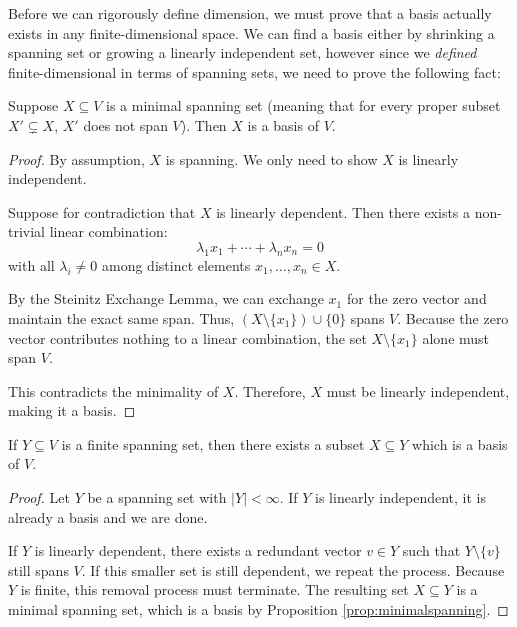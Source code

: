 \documentclass[../linear_algebra_and_groups.tex]{subfiles}
\begin{document}
Before we can rigorously define dimension, we must prove that a basis actually exists in any finite-dimensional space. We can find a basis either by shrinking a spanning set or growing a linearly independent set, however since we \textit{defined} finite-dimensional in terms of spanning sets, we need to prove the following fact:

\begin{proposition}
\label{prop:minimalspanning}
    \begin{shaded*}
        Suppose $X \subseteq V$ is a minimal spanning set (meaning that for every proper subset $X' \subsetneq X$, $X'$ does not span $V$). Then $X$ is a basis of $V$.
    \end{shaded*}
\end{proposition}
\begin{proof}
    By assumption, $X$ is spanning. We only need to show $X$ is linearly independent. 
    
    Suppose for contradiction that $X$ is linearly dependent. Then there exists a non-trivial linear combination:
    \[ \lambda_1 x_1 + \cdots + \lambda_n x_n = 0 \]
    with all $\lambda_i \ne 0$ among distinct elements $x_1, \dots, x_n \in X$. 
    
    By the Steinitz Exchange Lemma, we can exchange $x_1$ for the zero vector and maintain the exact same span. Thus, $(X \setminus \{x_1\}) \cup \{0\}$ spans $V$. Because the zero vector contributes nothing to a linear combination, the set $X \setminus \{x_1\}$ alone must span $V$. 
    
    This contradicts the minimality of $X$. Therefore, $X$ must be linearly independent, making it a basis.
    \qedhere
\end{proof}

\begin{corollary}
    \begin{shaded*}
        If $Y \subseteq V$ is a finite spanning set, then there exists a subset $X \subseteq Y$ which is a basis of $V$.
    \end{shaded*}
\end{corollary}
\begin{proof}
    Let $Y$ be a spanning set with $|Y| < \infty$. If $Y$ is linearly independent, it is already a basis and we are done. 
    
    If $Y$ is linearly dependent, there exists a redundant vector $v \in Y$ such that $Y \setminus \{v\}$ still spans $V$. If this smaller set is still dependent, we repeat the process. Because $Y$ is finite, this removal process must terminate. The resulting set $X \subseteq Y$ is a minimal spanning set, which is a basis by Proposition \ref{prop:minimalspanning}.
    \qedhere
\end{proof}
\end{document}

